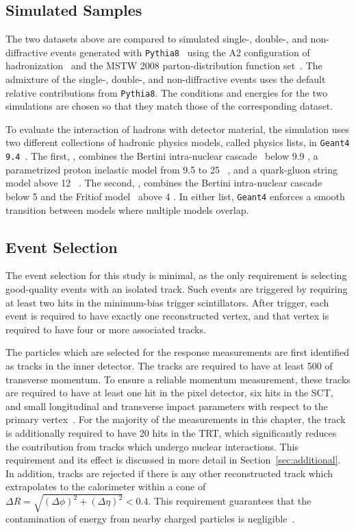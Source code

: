 \subsection{Simulated Samples}
The two datasets above are compared to simulated single-, double-, and non-diffractive events generated with \texttt{Pythia8}~\cite{PYTHIA8} using the A2 configuration of hadronization~\cite{AU2} and the MSTW 2008 parton-distribution function set~\cite{MSTW,MSTW2}.
The admixture of the single-, double-, and non-diffractive events uses the default relative contributions from \texttt{Pythia8}.
The conditions and energies for the two simulations are chosen so that they match those of the corresponding dataset.

To evaluate the interaction of hadrons with detector material, the simulation uses two different collections of hadronic physics models, called physics lists, in \texttt{Geant4 9.4}~\cite{G4hadronics}.
The first, \QGSP, combines the Bertini intra-nuclear cascade~\cite{BERT21,BERT22,BERT23} below 9.9 \GeV, a parametrized proton inelastic model from 9.5 to 25 \GeV~\cite{GHEISHA20}, and a quark-gluon string model above 12 \GeV~\cite{QGS15,QGS16,QGS17,QGS18,QGS19}. 
The second, \FTFP, combines the Bertini intra-nuclear cascade~\cite{BERT21,BERT22,BERT23} below 5 \GeV and the Fritiof model~\cite{FTF24,FTF25,FTF26,FTF27} above 4 \GeV.
In either list, \texttt{Geant4} enforces a smooth transition between models where multiple models overlap.

\subsection{Event Selection}
\label{sec:inclusive_selection}
The event selection for this study is minimal, as the only requirement is selecting good-quality events with an isolated track. 
Such events are triggered by requiring at least two hits in the minimum-bias trigger scintillators. 
After trigger, each event is required to have exactly one reconstructed vertex, and that vertex is required to have four or more associated tracks.

The particles which are selected for the response measurements are first identified as tracks in the inner detector.
The tracks are required to have at least 500 \MeV of transverse momentum.
To ensure a reliable momentum measurement, these tracks are required to have at least one hit in the pixel detector, six hits in the SCT, and small longitudinal and transverse impact parameters with respect to the primary vertex~\cite{PERF-2011-05}.
For the majority of the measurements in this chapter, the track is additionally required to have 20 hits in the TRT, which significantly reduces the contribution from tracks which undergo nuclear interactions.
This requirement and its effect is discussed in more detail in Section~\ref{sec:additional}. 
In addition, tracks are rejected if there is any other reconstructed track which extrapolates to the calorimeter within a cone of $\Delta R = \sqrt{(\Delta\phi)^2 + (\Delta\eta)^2} < 0.4$.
This requirement guarantees that the contamination of energy from nearby charged particles is negligible~\cite{PERF-2011-05}.

